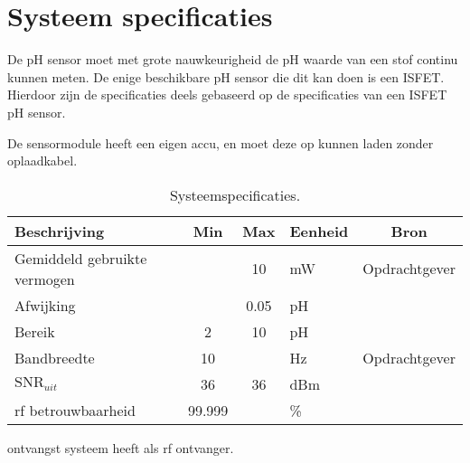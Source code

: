 \section{Systeem specificaties}\label{sec:systemSpecifications}
De pH sensor moet met grote nauwkeurigheid de pH waarde van een stof continu kunnen meten. 
De enige beschikbare pH sensor die dit kan doen is een ISFET.
Hierdoor zijn de specificaties deels gebaseerd op de specificaties van een ISFET pH sensor.

De sensormodule heeft een eigen accu, en moet deze op kunnen laden zonder oplaadkabel.

\begin{table}[ht]
    \centering
    \begin{tabular}{|l|c c|l|c|}
        \hline
        Beschrijving                 & Min & Max  & Eenheid   & Bron \\
        \hline 
        Gemiddeld gebruikte vermogen &          & 10    & mW        & Opdrachtgever \\
        Afwijking                    &          & 0.05  & pH        & \cite{isfet} \\ 
        Bereik                       & 2        & 10    & pH        & \cite{isfet} \\
        Bandbreedte                  & 10       &       & Hz        & Opdrachtgever\\
        $\mathrm{SNR}_{uit}$         & 36       & 36    & dBm       &  \\
        rf betrouwbaarheid           & 99.999   &       & \%        & \\
        \hline
    \end{tabular}
    \caption{Systeemspecificaties.}
    \label{tab:systemSpecs}
\end{table}

ontvangst systeem heeft \mcu als rf ontvanger.





